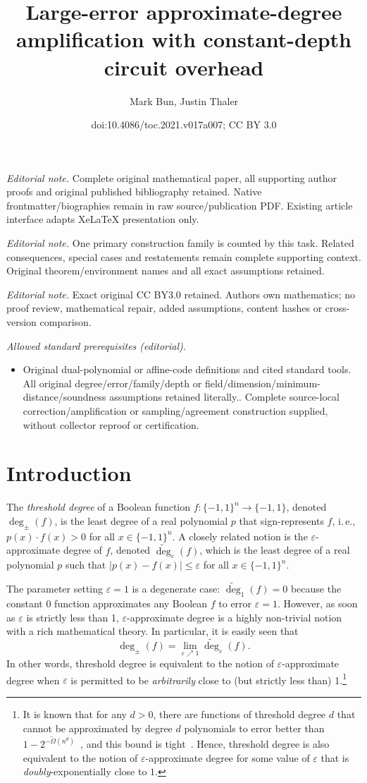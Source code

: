 \documentclass[11pt]{article}
\title{Large-error approximate-degree amplification with constant-depth circuit overhead}
\author{Mark Bun, Justin Thaler}
\date{doi:10.4086/toc.2021.v017a007; CC BY 3.0}
\numberwithin{equation}{section}
\theoremstyle{definition}
\theoremstyle{plain}
\newcommand{\ie}{i.\,e.}
\newcommand{\bits}{\{-1,1\}}
\newcommand{\eps}{\varepsilon}
\newcommand{\adeg}{\widetilde{\operatorname{deg}}}
\begin{document}
\maketitle
\noindent\textit{Editorial note.} Complete original mathematical paper, all supporting author proofs and original published bibliography retained. Native frontmatter/biographies remain in raw source/publication PDF. Existing article interface adapts XeLaTeX presentation only.\par\medskip
\noindent\textit{Editorial note.} One primary construction family is counted by this task. Related consequences, special cases and restatements remain complete supporting context. Original theorem/environment names and all exact assumptions retained.\par\medskip
\noindent\textit{Editorial note.} Exact original CC BY3.0 retained. Authors own mathematics; no proof review, mathematical repair, added assumptions, content hashes or cross-version comparison.\par\medskip
\noindent\textit{Allowed standard prerequisites (editorial).}\begin{itemize}
\item Original dual-polynomial or affine-code definitions and cited standard tools. All original degree/error/family/depth or field/dimension/minimum-distance/soundness assumptions retained literally.. Complete source-local correction/amplification or sampling/agreement construction supplied, without collector reproof or certification.
\end{itemize}\medskip
\section{Introduction}
The \emph{threshold degree} of a Boolean function $f\colon \bits^n \to \bits$, denoted $\deg_{\pm}(f)$, 
is the least degree of a real polynomial $p$ that sign-represents $f$, \ie, $p(x) \cdot f(x) > 0$
for all $x \in \bits^n$.
A closely related notion is the $\eps$-approximate degree of $f$, denoted $\adeg_{\eps}(f)$, which is the least degree of a 
real polynomial $p$ such that $|p(x)-f(x)| \leq \eps$ for all $x \in \bits^n$. 

The parameter setting $\eps=1$ is a degenerate case: $\adeg_1(f)=0$ because 
the constant 0 function approximates any Boolean $f$ to error $\eps=1$. 
However, as soon as $\eps$ is strictly less than 1, $\eps$-approximate degree is a highly non-trivial
notion with a rich mathematical theory.
In particular, it is easily seen that 
$$\deg_{\pm}(f)=\lim_{\eps \nearrow 1} \adeg_{\eps}(f).$$ In other words, threshold degree is equivalent to the notion of $\eps$-approximate
degree when $\eps$ is permitted to be \emph{arbitrarily} close to (but strictly less than) 1.\footnote{It is known that for any $d > 0$, there are functions of threshold degree $d$
	that cannot be approximated by degree $d$ polynomials to error better than $1-2^{-\tilde{\Omega}(n^d)}$~\cite{podolskii2007perceptrons},
	and this bound is tight~\cite{bvdw}. Hence, threshold degree is also equivalent to the notion of $\eps$-approximate degree for some value of $\eps$
	that is \emph{doubly}-exponentially close to $1$.}
\end{document}
